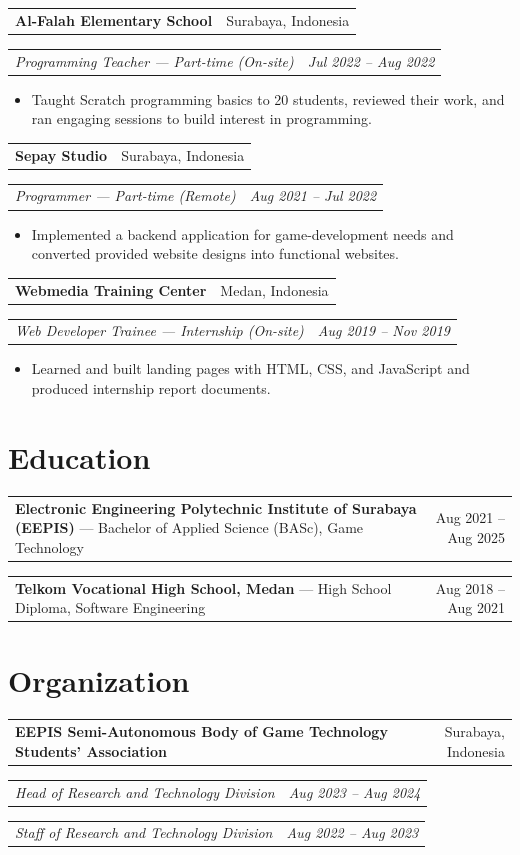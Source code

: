 \documentclass[10pt,a4paper]{article}
\makeatletter
\newcommand{\company}[2]{%
  \vspace{0.28em}%
  \begin{tabularx}{\textwidth}{@{}Xr@{}}
    \textbf{#1} & \textcolor{muted}{#2}
  \end{tabularx}\vspace{-0.45em}
}
\newcommand{\role}[2]{%
  \begin{tabularx}{\textwidth}{@{}Xr@{}}
    \textit{#1} & \textit{#2}
  \end{tabularx}\vspace{-0.55em}
}
\newcommand{\entry}[2]{%
  \begin{tabularx}{\textwidth}{@{}Xr@{}}
    #1 & \textcolor{muted}{#2}
  \end{tabularx}
}
\makeatother
\begin{document}
\company{Al-Falah Elementary School}{Surabaya, Indonesia}
\role{Programming Teacher --- Part-time (On-site)}{Jul 2022 -- Aug 2022}
\begin{itemize}
  \item Taught Scratch programming basics to 20 students, reviewed their work, and ran engaging sessions to build interest in programming.
\end{itemize}

\company{Sepay Studio}{Surabaya, Indonesia}
\role{Programmer --- Part-time (Remote)}{Aug 2021 -- Jul 2022}
\begin{itemize}
  \item Implemented a backend application for game-development needs and converted provided website designs into functional websites.
\end{itemize}

\company{Webmedia Training Center}{Medan, Indonesia}
\role{Web Developer Trainee --- Internship (On-site)}{Aug 2019 -- Nov 2019}
\begin{itemize}
  \item Learned and built landing pages with HTML, CSS, and JavaScript and produced internship report documents.
\end{itemize}

\section*{Education}
\entry{\textbf{Electronic Engineering Polytechnic Institute of Surabaya (EEPIS)} --- Bachelor of Applied Science (BASc), Game Technology}{Aug 2021 -- Aug 2025}
\entry{\textbf{Telkom Vocational High School, Medan} --- High School Diploma, Software Engineering}{Aug 2018 -- Aug 2021}

\section*{Organization}
\company{EEPIS Semi-Autonomous Body of Game Technology Students' Association}{Surabaya, Indonesia}
\role{Head of Research and Technology Division}{Aug 2023 -- Aug 2024}
\role{Staff of Research and Technology Division}{Aug 2022 -- Aug 2023}
\end{document}

